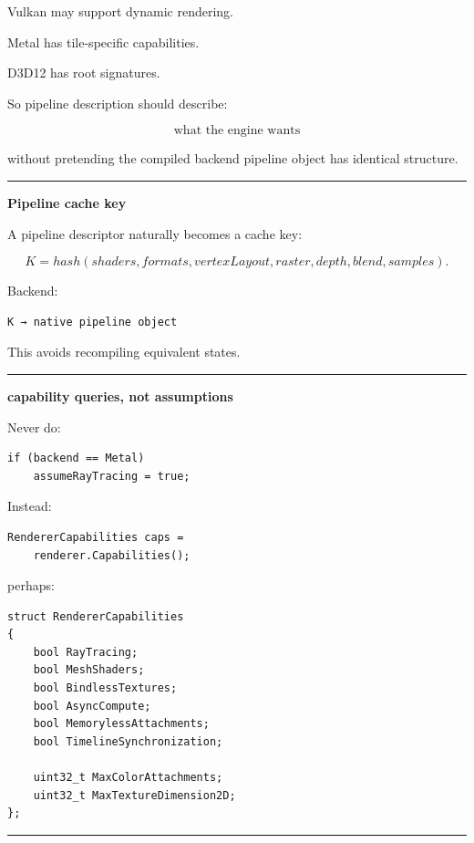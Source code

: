 Vulkan may support dynamic rendering.

Metal has tile-specific capabilities.

D3D12 has root signatures.

So pipeline description should describe:

\[
\boxed{\text{what the engine wants}}
\]

without pretending the compiled backend pipeline object has identical structure.

\begin{center}\rule{0.5\linewidth}{0.5pt}\end{center}

\textbf{Pipeline cache key}

A pipeline descriptor naturally becomes a cache key:

\[
K=
hash(
shaders,
formats,
vertexLayout,
raster,
depth,
blend,
samples
).
\]

Backend:

\begin{verbatim}
K → native pipeline object
\end{verbatim}

This avoids recompiling equivalent states.

\begin{center}\rule{0.5\linewidth}{0.5pt}\end{center}

\textbf{capability queries, not assumptions}

Never do:

\begin{verbatim}
if (backend == Metal)
    assumeRayTracing = true;
\end{verbatim}

Instead:

\begin{verbatim}
RendererCapabilities caps =
    renderer.Capabilities();
\end{verbatim}

perhaps:

\begin{verbatim}
struct RendererCapabilities
{
    bool RayTracing;
    bool MeshShaders;
    bool BindlessTextures;
    bool AsyncCompute;
    bool MemorylessAttachments;
    bool TimelineSynchronization;

    uint32_t MaxColorAttachments;
    uint32_t MaxTextureDimension2D;
};
\end{verbatim}

\begin{center}\rule{0.5\linewidth}{0.5pt}\end{center}

